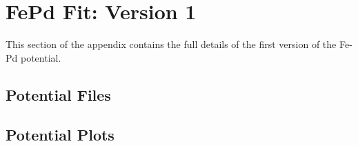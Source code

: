 \chapter{FePd Fit: Version 1}
\label{section:pdfefit1}


This section of the appendix contains the full details of the first version of the Fe-Pd potential.

\FloatBarrier
\section{Potential Files}
\label{section:fepdv1potfiles}

\FloatBarrier





















\FloatBarrier
\section{Potential Plots}
\label{section:fepdv1potplots}

